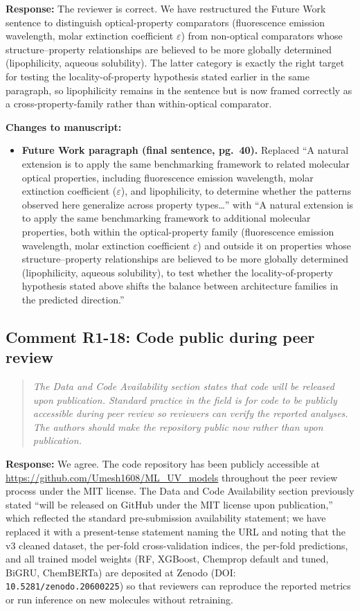 \documentclass[11pt]{article}
\newenvironment{reviewer}{%
  \begin{quote}\itshape\color{black!70}}{%
  \end{quote}}
\newcommand{\response}[1]{\noindent\textbf{Response:} #1\par\medskip}
\newenvironment{changes}{%
  \noindent\textbf{Changes to manuscript:}
  \begin{itemize}[leftmargin=2em,itemsep=2pt]}{%
  \end{itemize}\medskip}
\begin{document}
\response{The reviewer is correct. We have restructured the Future Work sentence to distinguish optical-property comparators (fluorescence emission wavelength, molar extinction coefficient $\varepsilon$) from non-optical comparators whose structure--property relationships are believed to be more globally determined (lipophilicity, aqueous solubility). The latter category is exactly the right target for testing the locality-of-property hypothesis stated earlier in the same paragraph, so lipophilicity remains in the sentence but is now framed correctly as a cross-property-family rather than within-optical comparator.}

\begin{changes}
  \item \textbf{Future Work paragraph (final sentence, pg.\ 40).} Replaced ``A natural extension is to apply the same benchmarking framework to related molecular optical properties, including fluorescence emission wavelength, molar extinction coefficient ($\varepsilon$), and lipophilicity, to determine whether the patterns observed here generalize across property types\ldots'' with ``A natural extension is to apply the same benchmarking framework to additional molecular properties, both within the optical-property family (fluorescence emission wavelength, molar extinction coefficient $\varepsilon$) and outside it on properties whose structure--property relationships are believed to be more globally determined (lipophilicity, aqueous solubility), to test whether the locality-of-property hypothesis stated above shifts the balance between architecture families in the predicted direction.''
\end{changes}

\subsection*{Comment R1-18: Code public during peer review}
\begin{reviewer}
The Data and Code Availability section states that code will be released upon publication. Standard practice in the field is for code to be publicly accessible during peer review so reviewers can verify the reported analyses. The authors should make the repository public now rather than upon publication.
\end{reviewer}

\response{We agree. The code repository has been publicly accessible at \url{https://github.com/Umesh1608/ML_UV_models} throughout the peer review process under the MIT license. The Data and Code Availability section previously stated ``will be released on GitHub under the MIT license upon publication,'' which reflected the standard pre-submission availability statement; we have replaced it with a present-tense statement naming the URL and noting that the v3 cleaned dataset, the per-fold cross-validation indices, the per-fold predictions, and all trained model weights (RF, XGBoost, Chemprop default and tuned, BiGRU, ChemBERTa) are deposited at Zenodo (DOI: \texttt{10.5281/zenodo.20600225}) so that reviewers can reproduce the reported metrics or run inference on new molecules without retraining.}
\end{document}

